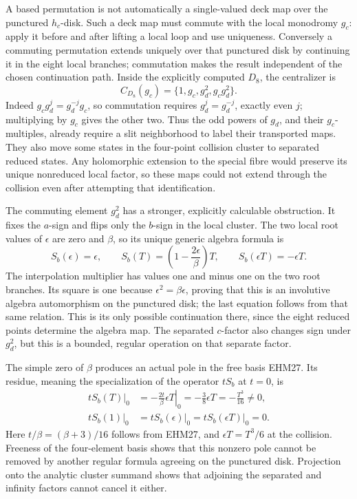 \documentclass[
  10pt,
  a4paper,
]{article}
\begin{document}
A based permutation is not automatically a single-valued deck map over
the punctured \(h_c\)-disk. Such a deck map must commute with the local
monodromy \(g_c\): apply it before and after lifting a local loop and
use uniqueness. Conversely a commuting permutation extends uniquely over
that punctured disk by continuing it in the eight local branches;
commutation makes the result independent of the chosen continuation
path. Inside the explicitly computed \(D_8\), the centralizer is \[
C_{D_8}(g_c)=\{1,g_c,g_d^2,g_cg_d^2\}.
\tag{EHM42}
\] Indeed \(g_cg_d^j=g_d^{-j}g_c\), so commutation requires
\(g_d^j=g_d^{-j}\), exactly even \(j\); multiplying by \(g_c\) gives the
other two. Thus the odd powers of \(g_d\), and their \(g_c\)-multiples,
already require a slit neighborhood to label their transported maps.
They also move some states in the four-point collision cluster to
separated reduced states. Any holomorphic extension to the special fibre
would preserve its unique nonreduced local factor, so these maps could
not extend through the collision even after attempting that
identification.

The commuting element \(g_d^2\) has a stronger, explicitly calculable
obstruction. It fixes the \(a\)-sign and flips only the \(b\)-sign in
the local cluster. The two local root values of \(\epsilon\) are zero
and \(\beta\), so its unique generic algebra formula is \[
S_b(\epsilon)=\epsilon,\qquad
S_b(T)=\left(1-\frac{2\epsilon}{\beta}\right)T,
\qquad S_b(\epsilon T)=-\epsilon T.
\tag{EHM43}
\] The interpolation multiplier has values one and minus one on the two
root branches. Its square is one because \(\epsilon^2=\beta\epsilon\),
proving that this is an involutive algebra automorphism on the punctured
disk; the last equation follows from that same relation. This is its
only possible continuation there, since the eight reduced points
determine the algebra map. The separated \(c\)-factor also changes sign
under \(g_d^2\), but this is a bounded, regular operation on that
separate factor.

The simple zero of \(\beta\) produces an actual pole in the free basis
EHM27. Its residue, meaning the specialization of the operator \(tS_b\)
at \(t=0\), is \[
\begin{aligned}
\left.tS_b(T)\right|_{0}
&=-\left.\frac{2t}{\beta}\epsilon T\right|_0
=-\frac38\epsilon T=-\frac{T^3}{16}\ne0,\\
\left.tS_b(1)\right|_0&=\left.tS_b(\epsilon)\right|_0
=\left.tS_b(\epsilon T)\right|_0=0.
\end{aligned}
\tag{EHM44}
\] Here \(t/\beta=(\beta+3)/16\) follows from EHM27, and
\(\epsilon T=T^3/6\) at the collision. Freeness of the four-element
basis shows that this nonzero pole cannot be removed by another regular
formula agreeing on the punctured disk. Projection onto the analytic
cluster summand shows that adjoining the separated and infinity factors
cannot cancel it either.
\end{document}
